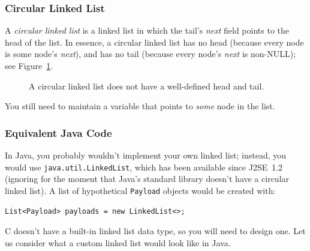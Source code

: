 \subsubsection{Circular Linked List} \label{subsubsec:circularlinkedlist}

A \textit{circular linked list} is a linked list in which the tail's \textit{next} field points to the head of the list.
In essence, a circular linked list has no head (because every node is some node's \textit{next}), and has no tail (because every node's \textit{next} is non-NULL);
see Figure~\ref{fig:circular-linked-list}.

\begin{figure}[h]
    \centering
    \caption{A circular linked list does not have a well-defined head and tail.}\label{fig:circular-linked-list}
\end{figure}

You still need to maintain a variable that points to \textit{some} node in the list.

\subsubsection{Equivalent Java Code} \label{subsubsec:equivalentJava}

In Java, you probably wouldn't implement your own linked list;
instead, you would use \lstinline{java.util.LinkedList}, which has been available since J2SE~1.2
(ignoring for the moment that Java's standard library doesn't have a circular linked list).
A list of hypothetical \lstinline{Payload} objects would be created with:
\begin{lstlisting}[numbers=none]
    List<Payload> payloads = new LinkedList<>;
\end{lstlisting}

C doesn't have a built-in linked list data type, so you will need to design one.
Let us consider what a custom linked list would look like in Java.

